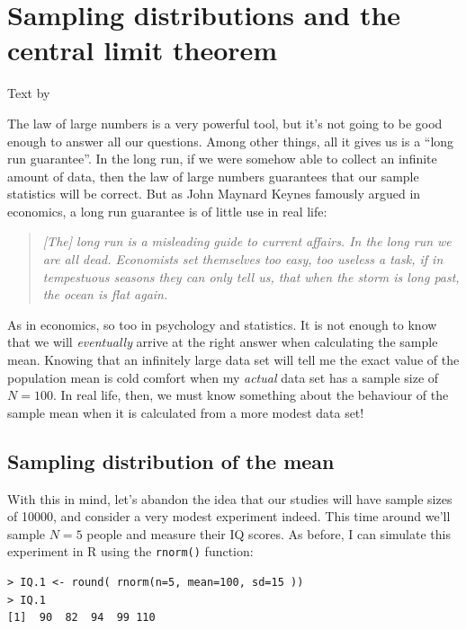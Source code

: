 \documentclass[
]{book}
\begin{document}
\hypertarget{samplesandclt}{%
\section{Sampling distributions and the central limit theorem}\label{samplesandclt}}

Text by \citet{Navarro2018}

The law of large numbers is a very powerful tool, but it's not going to be good enough to answer all our questions. Among other things, all it gives us is a ``long run guarantee''. In the long run, if we were somehow able to collect an infinite amount of data, then the law of large numbers guarantees that our sample statistics will be correct. But as John Maynard Keynes famously argued in economics, a long run guarantee is of little use in real life:

\begin{quote}
\emph{{[}The{]} long run is a misleading guide to current affairs. In the long run we are all dead. Economists set themselves too easy, too useless a task, if in tempestuous seasons they can only tell us, that when the storm is long past, the ocean is flat again.} \citet{Keynes1923}
\end{quote}

As in economics, so too in psychology and statistics. It is not enough to know that we will \emph{eventually} arrive at the right answer when calculating the sample mean. Knowing that an infinitely large data set will tell me the exact value of the population mean is cold comfort when my \emph{actual} data set has a sample size of \(N=100\). In real life, then, we must know something about the behaviour of the sample mean when it is calculated from a more modest data set!

\hypertarget{samplingdists}{%
\subsection{Sampling distribution of the mean}\label{samplingdists}}

With this in mind, let's abandon the idea that our studies will have sample sizes of 10000, and consider a very modest experiment indeed. This time around we'll sample \(N=5\) people and measure their IQ scores. As before, I can simulate this experiment in R using the \texttt{rnorm()} function:

\begin{verbatim}
> IQ.1 <- round( rnorm(n=5, mean=100, sd=15 ))
> IQ.1
[1]  90  82  94  99 110
\end{verbatim}
\end{document}
